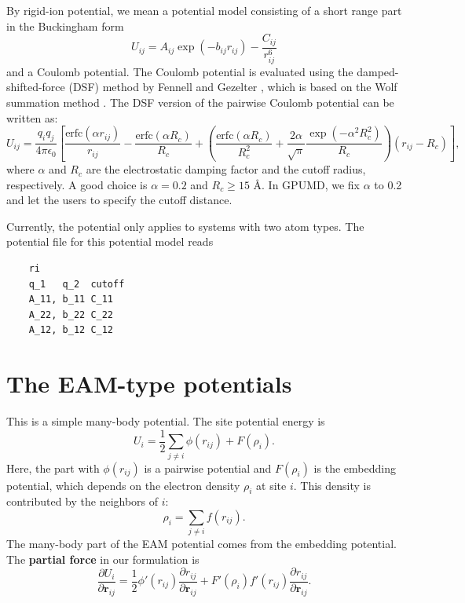 \documentclass[12pt,a4paper]{report}
\newcommand{\vect}[1]{\boldsymbol{#1}}
\begin{document}
By rigid-ion potential, we mean a potential model consisting of a short range part in the Buckingham form
\begin{equation}
U_{ij} = A_{ij} \exp\left( - b_{ij} r_{ij} \right)
- \frac{C_{ij} }{ r_{ij}^{6} }
\end{equation}
and a Coulomb potential. The Coulomb potential is evaluated using the damped-shifted-force (DSF) method by Fennell and Gezelter \cite{fennell2006jcp}, which is based on the Wolf summation method \cite{wolf1999jcp}. The DSF version of the pairwise Coulomb potential can be written as:
\begin{equation}
U_{ij} = \frac{q_iq_j}{4\pi\epsilon_0}
\left[
\frac{\text{erfc}(\alpha r_{ij})}{r_{ij}} -
\frac{\text{erfc}(\alpha R_{c})}{R_{c}} +
  \left(
    \frac{\text{erfc}(\alpha R_{c})}{R_{c}^2} +
    \frac{2\alpha}{\sqrt{\pi}}
    \frac{\exp(-\alpha^2R_c^2)}{R_{c}}
  \right) (r_{ij} - R_c)
\right],
\end{equation}
where $\alpha$ and $R_c$ are the electrostatic damping factor and the cutoff radius, respectively.
A good choice is $\alpha=0.2$ and $R_c \geq 15$ \AA. In GPUMD, we fix $\alpha$  to 0.2 and let the users to specify the cutoff distance.

Currently, the potential only applies to systems with two atom types. The potential file for this potential model reads
\begin{verbatim}
    ri
    q_1   q_2  cutoff
    A_11, b_11 C_11
    A_22, b_22 C_22
    A_12, b_12 C_12
\end{verbatim}


\section{The EAM-type potentials}

This is a simple many-body potential. The site potential energy is
\begin{equation}
U_i = \frac{1}{2} \sum_{j\neq i} \phi(r_{ij}) + F (\rho_i).
\end{equation}
Here, the part with $\phi(r_{ij})$ is a pairwise potential and $F(\rho_i)$ is the embedding potential, which depends on the electron density $\rho_i$ at site $i$. This density is contributed by the neighbors of $i$:
\begin{equation}
\rho_i = \sum_{j\neq i} f(r_{ij}).
\end{equation}
The many-body part of the EAM potential comes from the embedding potential. The \textbf{partial force} in our formulation is
\begin{equation}
\frac{\partial U_i}{\partial \vect{r}_{ij}}
= \frac{1}{2}  \phi'(r_{ij})  \frac{\partial r_{ij}} {\partial \vect{r}_{ij}} +
F'(\rho_i)  f'(r_{ij}) \frac{\partial r_{ij}} {\partial \vect{r}_{ij}}.
\end{equation}
\end{document}
